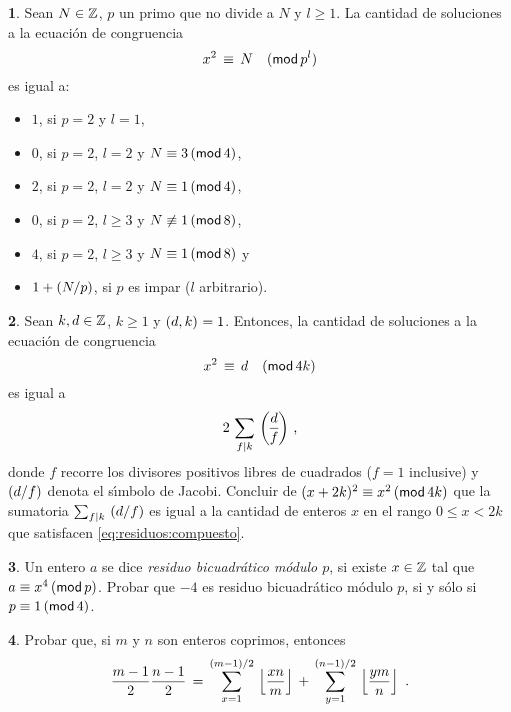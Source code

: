 \theoremstyle{definition}
\newtheorem{ejerResiduos}{\ejername}[section]


\begin{ejerResiduos}\label{ejer:residuos:potencia}
	Sean $N\in\Enteros$, $p$ un primo que no divide a $N$ y $l\geq 1$.
	La cantidad de soluciones a la ecuaci\'on de congruencia
	\begin{equation}
		\label{eq:ejer:residuos:potencia}
		x^2\,\equiv\,N\modulo[p^l]
	\end{equation}
	es igual a:
	\begin{itemize}
		\item $1$, si $p=2$ y $l=1$,
		\item $0$, si $p=2$, $l=2$ y $N\equiv 3\tmodulo[4]$,
		\item $2$, si $p=2$, $l=2$ y $N\equiv 1\tmodulo[4]$,
		\item $0$, si $p=2$, $l\geq 3$ y $N\not\equiv 1\tmodulo[8]$,
		\item $4$, si $p=2$, $l\geq 3$ y $N\equiv 1\tmodulo[8]$ y
		\item $1+\tlegendre N{p}$, si $p$ es impar ($l$ arbitrario).
	\end{itemize}
\end{ejerResiduos}

\begin{ejerResiduos}\label{ejer:residuos:compuesto}
	Sean $k,d\in\Enteros$, $k\geq 1$ y $\mcd{d,k}=1$. Entonces, la
	cantidad de soluciones a la ecuaci\'on de congruencia
	\begin{equation}
		\label{eq:residuos:compuesto}
		x^2\,\equiv\,d\modulo[4k]
	\end{equation}
	es igual a
	\begin{displaymath}
		2\,\sum_{f\mid k}\,\jacobi d{f}
		\text{ ,}
	\end{displaymath}
	donde $f$ recorre los divisores positivos libres de cuadrados
	($f=1$ inclusive) y $\tjacobi d{f}$ denota el s\'{\i}mbolo de
	Jacobi. Concluir de $(x+2k)^2\equiv x^2\tmodulo[4k]$ que la sumatoria
	$\sum_{f\mid k}\,\tjacobi d{f}$ es igual a la cantidad de enteros $x$
	en el rango $0\leq x<2k$ que satisfacen \eqref{eq:residuos:compuesto}.
\end{ejerResiduos}

\begin{ejerResiduos}
	Un entero $a$ se dice \emph{residuo bicuadr\'atico m\'odulo $p$},
	si existe $x\in\Enteros$ tal que $a\equiv x^4\tmodulo[p]$. Probar
	que $-4$ es residuo bicuadr\'atico m\'odulo $p$, si y s\'olo si
	$p\equiv 1\tmodulo[4]$.%
\end{ejerResiduos}

\begin{ejerResiduos}
	Probar que, si $m$ y $n$ son enteros coprimos, entonces
	\begin{displaymath}
		\frac{m-1} 2\frac{n-1} 2\,=\,
			\sum_{x=1}^{(m-1)/2}\,\piso{\frac{xn} m}\,+\,
			\sum_{y=1}^{(n-1)/2}\,\piso{\frac{ym} n}
		\text{ .}
	\end{displaymath}
\end{ejerResiduos}

